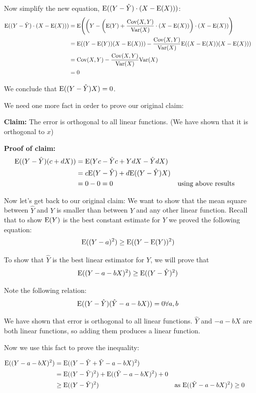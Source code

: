\documentclass{exam}
\begin{document}
Now simplify the new equation, $\text{E}((Y - \hat{Y}) \cdot (X - \text{E}(X)))$:
\begin{align*}
\text{E}((Y - \hat{Y}) \cdot (X - \text{E}(X))) &= \text{E} \Bigg( \bigg(Y - \bigg(\text{E}(Y) + \frac{\text{Cov}(X, Y)}{\text{Var}(X)} \cdot (X - \text{E}(X))\bigg) \cdot (X - \text{E}(X)) \Bigg)\\
&= \text{E}((Y - \text{E}(Y))(X - \text{E}(X))) - \frac{\text{Cov}(X, Y)}{\text{Var}(X)} \text{E}((X - \text{E}(X))(X - \text{E}(X)))\\
&= \text{Cov}(X, Y) - \frac{\text{Cov}(X, Y)}{\text{Var}(X)} \text{Var}(X) \\
&= 0
\end{align*}

We conclude that $\text{E}((Y - \hat{Y})X) = 0$.

\clearpage

We need one more fact in order to prove our original claim:

\textbf{Claim: } The error is orthogonal to all linear functions. (We have shown that it is orthogonal to $x$)

\textbf{Proof of claim:} 
\begin{align*}
\text{E}((Y - \hat{Y}) (c + dX)) &= \text{E}(Yc - \hat{Y}c + YdX - \hat{Y}dX)\\
&= c\text{E}(Y - \hat{Y}) + d\text{E}((Y - \hat{Y})X)\\
&= 0 - 0 = 0 && \text{using above results}
\end{align*}


Now let's get back to our original claim: We want to show that the mean square between $\hat{Y}$ and $Y$ is smaller than between $Y$ and any other linear function. Recall that to show $\text{E}(Y)$ is the best constant estimate for $Y$ we proved the following equation: 
\[\text{E}((Y - a)^2) \geq \text{E}((Y - \text{E}(Y))^2)\]

To show that $\hat{Y}$ is the best linear estimator for $Y$, we will prove that 
\[\text{E}((Y - a - bX)^2) \geq \text{E}((Y - \hat{Y})^2)\]

Note the following relation:
\[\text{E}((Y - \hat{Y})(\hat{Y} - a - bX))  = 0 \forall a, b\]

We have shown that error is orthogonal to all linear functions. $\hat{Y}$ and $-a - bX$ are both linear functions, so adding them produces a linear function.

Now we use this fact to prove the inequality:

\begin{align*}
\text{E}((Y - a - bX)^2) &= \text{E}((Y - \hat{Y} + \hat{Y} - a - bX)^2)\\
&= \text{E}((Y - \hat{Y})^2) + \text{E}((\hat{Y} - a - bX)^2) + 0\\
&\geq \text{E}((Y - \hat{Y})^2) && \text{as $\text{E}((\hat{Y} - a - bX)^2) \geq 0$}
\end{align*}
\end{document}
